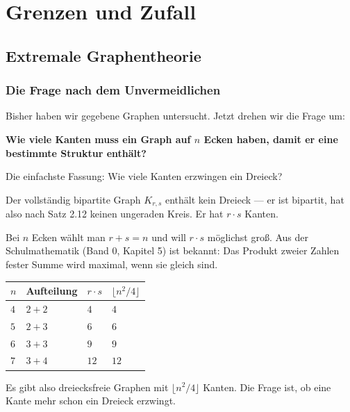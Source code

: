 \part{Grenzen und Zufall}

\chapter{Extremale Graphentheorie}

\section{Die Frage nach dem Unvermeidlichen}

Bisher haben wir gegebene Graphen untersucht. Jetzt drehen wir die Frage um:

\begin{merksatz}
\begin{center}
\begin{minipage}{0.9\textwidth}
\textbf{Wie viele Kanten muss ein Graph auf $n$ Ecken haben, damit er eine bestimmte Struktur  enthält?}
\end{minipage}
\end{center}

Die einfachste Fassung: Wie viele Kanten erzwingen ein Dreieck?

Der vollständig bipartite Graph $K_{r,s}$ enthält kein Dreieck --- er ist bipartit, hat also nach Satz 2.12 keinen ungeraden Kreis. Er hat $r \cdot s$ Kanten.

Bei $n$ Ecken wählt man $r + s = n$ und will $r\cdot s$ möglichst groß. Aus der Schulmathematik (Band 0, Kapitel 5) ist bekannt: Das Produkt zweier Zahlen fester Summe wird maximal, wenn sie gleich sind.

\begin{center}
\renewcommand{\arraystretch}{1.42}
\begin{tabular}{@{}P{1.4cm}P{2.0cm}P{1.8cm}P{2.2cm}@{}}
\toprule
$n$ & \textbf{Aufteilung} & $r \cdot s$ & $\lfloor n^2/4 \rfloor$\\
\midrule
$4$ & $2 + 2$ & $4$ & $4$\\
$5$ & $2+3$ & $6$ & $6$\\
$6$ & $3+3$ & $9$ & $9$\\
$7$ & $3+4$ & $12$ & $12$\\
\bottomrule
\end{tabular}
\end{center}

Es gibt also dreiecksfreie Graphen mit $\lfloor n^2/4 \rfloor$ Kanten. Die Frage ist, ob eine Kante mehr schon ein Dreieck erzwingt.
\end{merksatz}

